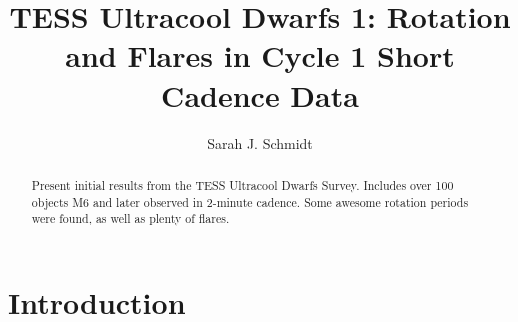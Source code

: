 \documentclass{aastex62}
\begin{document}
\title{TESS Ultracool Dwarfs 1: Rotation and Flares in Cycle 1 Short Cadence Data}




\author[0000-0002-7224-7702]{Sarah J. Schmidt}
\nocollaboration





\begin{abstract}

Present initial results from the TESS Ultracool Dwarfs Survey. Includes over 100 objects M6 and later observed in 2-minute cadence. Some awesome rotation periods were found, as well as plenty of flares. 

\end{abstract}

\keywords{}

\section{Introduction} \label{sec:intro}
\end{document}

